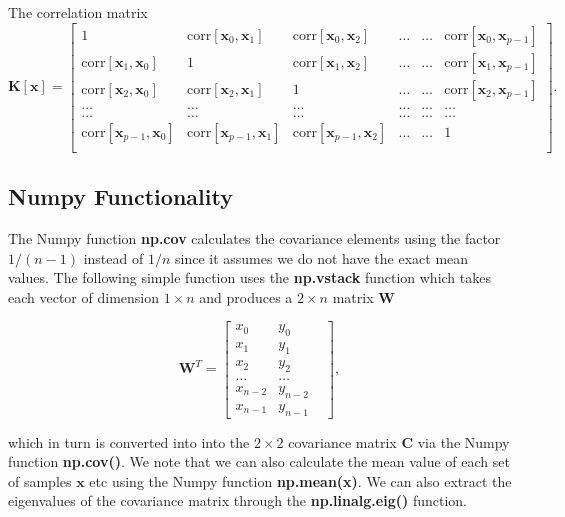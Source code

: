 \documentclass[%
oneside,                 %
final,                   %
10pt]{article}
\begin{document}
The correlation matrix
\[
\bm{K}[\bm{x}] = \begin{bmatrix}
1 & \mathrm{corr}[\bm{x}_0,\bm{x}_1]  & \mathrm{corr}[\bm{x}_0,\bm{x}_2] & \dots & \dots & \mathrm{corr}[\bm{x}_0,\bm{x}_{p-1}]\\
\mathrm{corr}[\bm{x}_1,\bm{x}_0] & 1  & \mathrm{corr}[\bm{x}_1,\bm{x}_2] & \dots & \dots & \mathrm{corr}[\bm{x}_1,\bm{x}_{p-1}]\\
\mathrm{corr}[\bm{x}_2,\bm{x}_0]   & \mathrm{corr}[\bm{x}_2,\bm{x}_1] & 1 & \dots & \dots & \mathrm{corr}[\bm{x}_2,\bm{x}_{p-1}]\\
\dots & \dots & \dots & \dots & \dots & \dots \\
\dots & \dots & \dots & \dots & \dots & \dots \\
\mathrm{corr}[\bm{x}_{p-1},\bm{x}_0]   & \mathrm{corr}[\bm{x}_{p-1},\bm{x}_1] & \mathrm{corr}[\bm{x}_{p-1},\bm{x}_{2}]  & \dots & \dots  & 1\\
\end{bmatrix}.
\]

\subsection{Numpy Functionality}

The Numpy function \textbf{np.cov} calculates the covariance elements using
the factor $1/(n-1)$ instead of $1/n$ since it assumes we do not have
the exact mean values.  The following simple function uses the
\textbf{np.vstack} function which takes each vector of dimension $1\times n$
and produces a $2\times n$ matrix $\bm{W}$

\[
\bm{W}^T = \begin{bmatrix} x_0 & y_0 \\
                          x_1 & y_1 \\
                          x_2 & y_2\\
                          \dots & \dots \\
                          x_{n-2} & y_{n-2}\\
                          x_{n-1} & y_{n-1} & 
             \end{bmatrix},
\]

which in turn is converted into into the $2\times 2$ covariance matrix
$\bm{C}$ via the Numpy function \textbf{np.cov()}. We note that we can also calculate
the mean value of each set of samples $\bm{x}$ etc using the Numpy
function \textbf{np.mean(x)}. We can also extract the eigenvalues of the
covariance matrix through the \textbf{np.linalg.eig()} function.
\end{document}
